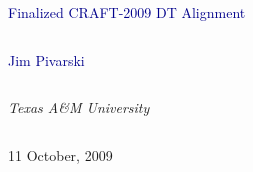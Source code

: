 \documentclass[compress]{beamer}
\begin{document}
\begin{frame}
\vfill
\begin{center}
\textcolor{darkblue}{\Large Finalized CRAFT-2009 DT Alignment}

\vfill
\begin{columns}
\begin{center}
\large
\textcolor{darkblue}{Jim Pivarski}
\end{center}
\end{columns}

\begin{columns}
\begin{center}
\scriptsize
{\it Texas A\&M University}
\end{center}
\end{columns}

\vfill
11 October, 2009

\end{center}
\end{frame}


\small
\end{document}
